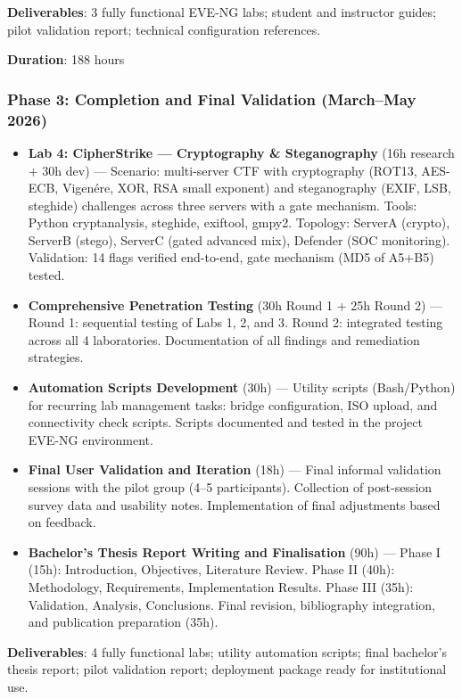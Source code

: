 \textbf{Deliverables}: 3 fully functional EVE-NG labs; student and instructor guides; pilot validation report; technical configuration references.

\textbf{Duration}: 188 hours

\subsubsection{Phase 3: Completion and Final Validation (March--May 2026)}

\begin{itemize}
\item
  \textbf{Lab 4: CipherStrike --- Cryptography \& Steganography} (16h research + 30h dev) --- Scenario: multi-server CTF with cryptography (ROT13, AES-ECB, Vigen\'{e}re, XOR, RSA small exponent) and steganography (EXIF, LSB, steghide) challenges across three servers with a gate mechanism. Tools: Python cryptanalysis, steghide, exiftool, gmpy2. Topology: ServerA (crypto), ServerB (stego), ServerC (gated advanced mix), Defender (SOC monitoring). Validation: 14 flags verified end-to-end, gate mechanism (MD5 of A5+B5) tested.
\item
  \textbf{Comprehensive Penetration Testing} (30h Round 1 + 25h Round 2) --- Round 1: sequential testing of Labs 1, 2, and 3. Round 2: integrated testing across all 4 laboratories. Documentation of all findings and remediation strategies.
\item
  \textbf{Automation Scripts Development} (30h) --- Utility scripts (Bash/Python) for recurring lab management tasks: bridge configuration, ISO upload, and connectivity check scripts. Scripts documented and tested in the project EVE-NG environment.
\item
  \textbf{Final User Validation and Iteration} (18h) --- Final informal validation sessions with the pilot group (4--5 participants). Collection of post-session survey data and usability notes. Implementation of final adjustments based on feedback.
\item
  \textbf{Bachelor's Thesis Report Writing and Finalisation} (90h) --- Phase I (15h): Introduction, Objectives, Literature Review. Phase II (40h): Methodology, Requirements, Implementation Results. Phase III (35h): Validation, Analysis, Conclusions. Final revision, bibliography integration, and publication preparation (35h).
\end{itemize}

\textbf{Deliverables}: 4 fully functional labs; utility automation scripts; final bachelor's thesis report; pilot validation report; deployment package ready for institutional use.

